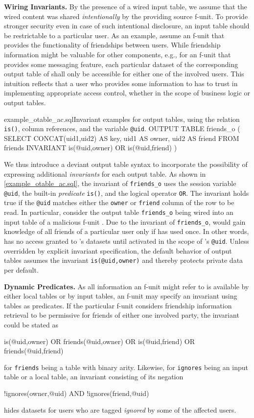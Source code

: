 \documentclass{src/acm_proc_article-sp} \else
\newcommand\myparagraph[1]{\medskip\noindent\textbf{#1.}}
\begin{document}
\myparagraph{Wiring Invariants}
By the presence of a wired input table, we assume that the wired
content was shared \emph{intentionally} by the providing source
f-unit. To provide stronger security even in case of such intentional
disclosure, an input table should be restrictable to a particular
user.
As an example, assume an f-unit  that provides the functionality
of friendships between users. While friendship information might be
valuable for other components, e.g., for an f-unit that provides some
messaging feature, each particular dataset of the corresponding
output table of  shall only be accessible for either one of the
involved users. This intuition reflects that a user who provides some
information to  has to trust  in implementing appropriate
access control, whether in the scope of business logic or output
tables.

\begin{lstfloat}{example_otable_ac.sql}{Invariant examples for output tables, using the relation \texttt{is()}, column references, and the variable \texttt{@uid}.}
  OUTPUT TABLE friends_o (
    SELECT    CONCAT(uid1,uid2) AS key,  uid1 AS owner,  uid2 AS friend
    FROM      friends
    INVARIANT is(@uid,owner) OR is(@uid,friend) )
\end{lstfloat}
We thus introduce a deviant output table syntax to incorporate the
possibility of expressing additional \emph{invariants} for each
output table.
As shown in \autoref{example_otable_ac.sql}, the invariant of
\texttt{friends\_o} uses the session variable \texttt{@uid}, the
built-in \emph{predicate} \texttt{is()}, and the logical operator
\texttt{OR}.
The invariant holds true if the \texttt{@uid} matches either the
\texttt{owner} or \texttt{friend} column of the row to be read.
In particular, consider the output table \texttt{friends\_o} being
wired into an input table of a malicious f-unit . Due to the
invariant of \texttt{friends\_o},  would gain knowledge of all
friends of a particular user  only if  has used  once.
In other words,  has no access granted to 's datasets until
activated in the scope of 's \texttt{@uid}.
Unless overridden by explicit invariant specification, the default
behavior of output tables assumes the invariant
\texttt{is(@uid,owner)} and thereby protects private data per default.

\myparagraph{Dynamic Predicates} As all information an f-unit might refer to is available by either local tables or by input tables, an f-unit may specify an invariant using tables as predicates. If the particular f-unit considers friendship information retrieval to be permissive for  friends of either one involved party, the invariant could be stated as
\begin{lsthere}
   is(@uid,owner) OR friends(@uid,owner) OR is(@uid,friend) OR friends(@uid,friend)
\end{lsthere}
for \texttt{friends} being a table with binary arity. Likewise, for \texttt{ignores} being an input table or a local table, an invariant consisting of its negation
\begin{lsthere}
   !ignores(owner,@uid) AND !ignores(friend,@uid)
\end{lsthere}
hides datasets for users who are tagged \emph{ignored} by some of the affected users.
\end{document}
